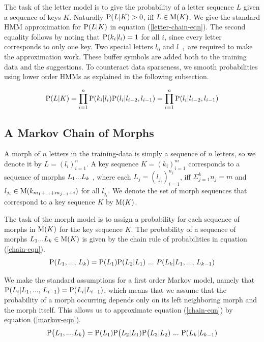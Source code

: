 \documentclass{llncs}
\begin{document}
The task of the letter model is to give the probability of a letter
sequence $L$ given a sequence of keys $K$. Naturally ${\rm P}(L|K) >
0$, iff $L \in {\rm M}(K)$. We give the standard HMM approximation for
${\rm P}(L|K)$ in equation (\ref{letter-chain-eqn}).  The second
equality follows by noting that ${\rm P}(k_i|l_i) = 1$ for all $i$,
since every letter corresponds to only one key. Two special letters
$l_{0}$ and $l_{-1}$ are required to make the approximation work. These
buffer symbols are added both to the training data and the
suggestions. To counteract data sparseness, we smooth probabilities
using lower order HMMs as explained in the following subsection.

\begin{equation}\label{letter-chain-eqn}
{\rm P}(L|K) = \prod_{i=1}^{n}{\rm P}(k_i|l_i){\rm P}(l_i|l_{i-2},l_{i-1}) = \prod_{i=1}^{n}{\rm P}(l_i|l_{i-2},l_{i-1})
\end{equation}

\subsection{A Markov Chain of Morphs}

A morph of $n$ letters in the training-data is simply a sequence of $n$
letters, so we denote it by $L = (l_i)_{i=1}^{n}$. A key sequence $K =
(k_i)_{i=1}^{m}$ corresponds to a sequence of morphs $L_1{\rm
  ... }L_k$ , where each $L_j = (l_{j_i})_{i=1}^{n_j}$, iff $\Sigma_{j
  = 1}^{k} n_j = m$ and $l_{j_i} \in {\rm M}(k_{m_1 + {\rm ... } +
  m_{j - 1} + i})$ for all $l_{j_i}$. We denote the set of morph
sequences that correspond to a key sequence $K$ by ${\rm M}(K)$.

The task of the morph model is to assign a probability for each
sequence of morphs in ${\rm M}(K)$ for the key sequence $K$. The
probability of a sequence of morphs $L_1{\rm ... }L_k \in {\rm M}(K)$
is given by the chain rule of probabilities in equation
(\ref{chain-eqn}).
\begin{equation}\label{chain-eqn}
{\rm P}(L_1{\rm, ..., }\ L_k) = {\rm P}(L_1){\rm P}(L_2|L_1)\ {\rm
  ... }\ P(L_k| L_1{\rm, ..., }\ L_{k - 1})
\end{equation}

We make the standard assumptions for a first order Markov model,
namely that ${\rm P}(L_i | L_1{\rm, ..., }\ L_{i-1}) = {\rm P}(L_i |
L_{i-1})$, which means that we assume that the probability of a morph
occurring depends only on its left neighboring morph and the morph
itself. This allows us to approximate equation (\ref{chain-eqn}) by
equation (\ref{markov-eqn}).
\begin{equation}\label{markov-eqn}
{\rm P}\big(L_1{\rm, ..., }L_k\big) = {\rm P}(L_1){\rm P}\big(L_2 |
L_1){\rm P}\big(L_3 | L_2)\ {\rm ... }\ {\rm P}(L_{k} | L_{k-1})
\end{equation}
\end{document}
